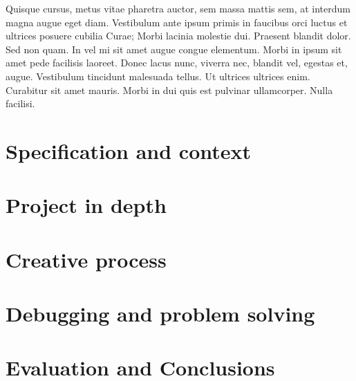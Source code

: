 \documentclass[12pt]{book}
\begin{document}
Quisque cursus, metus vitae pharetra auctor, sem massa mattis sem, at interdum magna augue eget diam. Vestibulum ante ipsum primis in faucibus orci luctus et ultrices posuere cubilia Curae; Morbi lacinia molestie dui. Praesent blandit dolor. Sed non quam. In vel mi sit amet augue congue elementum. Morbi in ipsum sit amet pede facilisis laoreet. Donec lacus nunc, viverra nec, blandit vel, egestas et, augue. Vestibulum tincidunt malesuada tellus. Ut ultrices ultrices enim. Curabitur sit amet mauris. Morbi in dui quis est pulvinar ullamcorper. Nulla facilisi.\\

\chapter{Specification and context}
\label{sec:org0b01f41}
\chapter{Project in depth}
\label{sec:orgc64bf65}
\chapter{Creative process}
\label{sec:org90f0100}
\chapter{Debugging and problem solving}
\label{sec:org9515b71}
\chapter{Evaluation and Conclusions}
\label{sec:org7c83807}
\\
\\
\end{document}
